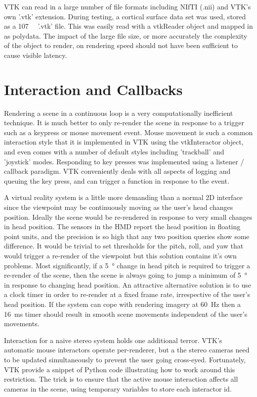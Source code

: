 \documentclass[MSc,paper=a4,pagesize=auto]{icldt}
\begin{document}
VTK can read in a large number of file formats including NIfTI (.nii) and VTK's own '.vtk' extension. During testing, a cortical surface data set was used, stored as a \SI{107}{\mebi\byte} '.vtk' file. This was easily read with a vtkReader object and mapped in as polydata. The impact of the large file size, or more accurately the complexity of the object to render, on rendering speed should not have been sufficient to cause visible latency.

\section{Interaction and Callbacks}
Rendering a scene in a continuous loop is a very computationally inefficient technique. It is much better to only re-render the scene in response to a trigger such as a keypress or mouse movement event. Mouse movement is such a common interaction style that it is implemented in VTK using the vtkInteractor object, and even comes with a number of default styles including 'trackball' and 'joystick' modes. Responding to key presses was implemented using a listener  / callback paradigm. VTK conveniently deals with all aspects of logging and queuing the key press, and can trigger a function in response to the event. 

A virtual reality system is a little more demanding than a normal 2D interface since the viewpoint may be continuously moving as the user's head changes position. Ideally the scene would be re-rendered in response to very small changes in head position. The sensors in the HMD report the head position in floating point units, and the precision is so high that any two position queries show some difference. It would be trivial to set thresholds for the pitch, roll, and yaw that would trigger a re-render of the viewpoint but this solution contains it's own problems. Most significantly, if a \SI{5}{\degree} change in head pitch is required to trigger a re-render of the scene, then the scene is always going to jump a minimum of \SI{5}{\degree} in response to changing head position. An attractive alternative solution is to use a clock timer in order to re-render at a fixed frame rate, irrespective of the user's head position. If the system can cope with rendering imagery at \SI{60}{\Hz} then a \SI{16}{\ms} timer should result in smooth scene movements independent of the user's movements.

Interaction for a naive stereo system holds one additional terror. VTK's automatic mouse interactors operate per-renderer, but a the stereo cameras need to be updated simultaneously to prevent the user going cross-eyed. Fortunately, VTK provide a snippet of Python code illustrating how to work around this restriction. The trick is to ensure that the active mouse interaction affects all cameras in the scene, using temporary variables to store each interactor id. 
\end{document}
